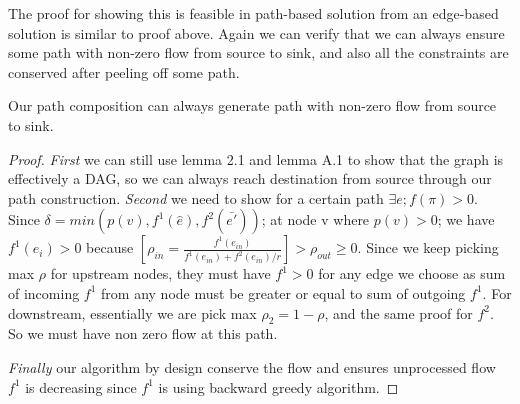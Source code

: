 \documentclass[twoside,leqno, 11pt]{article}
\begin{document}
The proof for showing this is feasible in path-based solution from an edge-based solution is similar to proof above. 
Again we can verify that we can always ensure some path with non-zero flow from source to sink, and also all the constraints are conserved after peeling off some path. 
\begin{theorem}Our path composition can always generate path with non-zero flow from source to sink. \end{theorem}
\begin{proof}
\textit{First} we can still use lemma 2.1 and lemma A.1 to show that the graph is effectively a DAG, so we can always reach destination from source through our path construction.
\textit{Second} we need to show for a certain path $\exists e; f(\pi)>0$. Since $\delta = min( p(v),f^1(\hat{e}),f^2(\bar{e'}))$; at node v where $p(v)>0$; we have $f^1(e_i)>0$ because $[\rho_{in} =\frac{ f^1(e_{in})}{f^1(e_{in})+f^2(e_{in})/r} ]>\rho_{out}\geq 0$. Since we keep picking max $\rho$ for upstream nodes, they must have $f^1>0 $ for any edge we choose as sum of incoming $f^1$ from any node must be greater or equal to sum of outgoing $f^1$. For downstream, essentially we are pick max $\rho_2 = 1-\rho$, and the same proof for $f^2$. So we must have non zero flow at this path.

\textit{Finally} our algorithm by design conserve the flow and ensures unprocessed flow $f^1$ is decreasing since $f^1$ is using backward greedy algorithm.
\end{proof}
\end{document}
